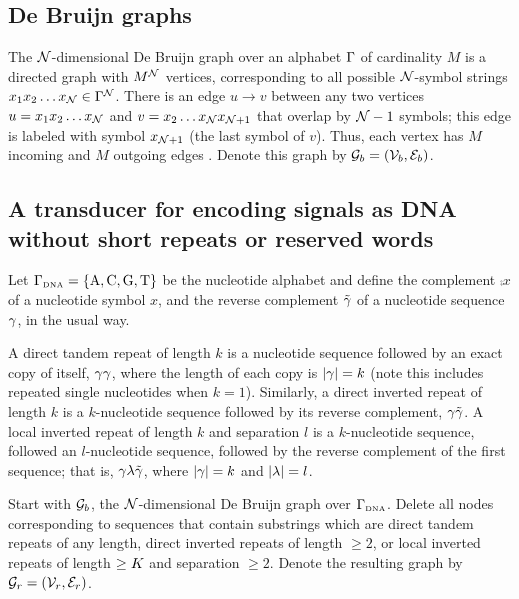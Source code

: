 \documentclass[english]{article}
\begin{document}
\subsection{De Bruijn graphs}

The ${\cal N}$-dimensional De Bruijn graph over an alphabet $\Gamma$ of cardinality $M$
is a directed graph with $M^{\cal N}$ vertices,
corresponding to all possible ${\cal N}$-symbol strings
$x_1 x_2 \ldots x_{\cal N} \in \Gamma^{\cal N}$.
There is an edge $u \to v$ between any two vertices
$u=x_1 x_2 \ldots x_{\cal N}$ and $v=x_2 \ldots x_{\cal N} x_{{\cal N}+1}$
that overlap by ${\cal N}-1$ symbols; this edge is labeled with symbol $x_{{\cal N}+1}$ (the last symbol of $v$).
Thus, each vertex has $M$ incoming and $M$ outgoing edges \cite{DeBruijn1946,PevznerEtAl2001}.
Denote this graph by ${\cal G}_b = ({\cal V}_b,{\cal E}_b)$.

\subsection{A transducer for encoding signals as DNA without short repeats or reserved words}

Let $\Gamma_{\mbox{\tiny DNA}} = \{ \mbox{A}, \mbox{C}, \mbox{G}, \mbox{T} \} $ be the nucleotide alphabet and define the complement $\comp{x}$ of a nucleotide symbol $x$,
and the reverse complement $\tilde{\gamma}$ of a nucleotide sequence $\gamma$, in the usual way.

A direct tandem repeat of length $k$ is a nucleotide sequence followed by an exact copy of itself, $\gamma \gamma$, where the length of each copy is $|\gamma|=k$
(note this includes repeated single nucleotides when $k=1$).
Similarly, a direct inverted repeat of length $k$ is a $k$-nucleotide sequence followed by its reverse complement, $\gamma \tilde{\gamma}$.
A local inverted repeat of length $k$ and separation $l$ is a $k$-nucleotide sequence, followed an $l$-nucleotide sequence, followed by the reverse complement
of the first sequence; that is, $\gamma \lambda \tilde{\gamma}$, where $|\gamma|=k$ and $|\lambda|=l$.

Start with ${\cal G}_b$, the ${\cal N}$-dimensional De Bruijn graph over $\Gamma_{\mbox{\tiny DNA}}$.
Delete all nodes corresponding to sequences that contain substrings which are
direct tandem repeats of any length,
direct inverted repeats of length $\geq 2$,
or local inverted repeats of length $\geq K$ and separation $\geq 2$.
Denote the resulting graph by ${\cal G}_r = ({\cal V}_r,{\cal E}_r)$.
\end{document}
